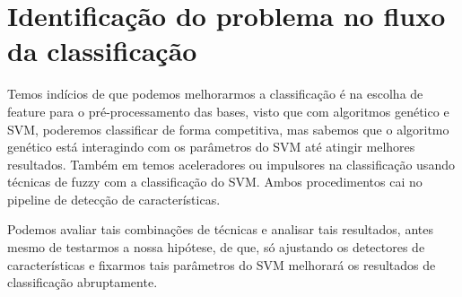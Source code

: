 \documentclass[12pt,a4paper,letterpaper]{article}
\begin{document}
\section{Identificação do problema no fluxo da classificação}
Temos indícios de que podemos melhorarmos a classificação é na escolha de feature
para o pré-processamento das bases, visto que com algoritmos genético e SVM,
poderemos classificar de forma competitiva, mas sabemos que o algoritmo genético
está interagindo com os parâmetros do SVM até atingir melhores resultados.
Também em temos aceleradores ou impulsores na classificação usando técnicas
de fuzzy com a classificação do SVM. Ambos procedimentos cai no pipeline de
detecção de características.

Podemos avaliar tais combinações de técnicas e analisar tais resultados, antes
mesmo de testarmos a nossa hipótese, de que, só ajustando os detectores de
características e fixarmos tais parâmetros do SVM melhorará os resultados de
classificação abruptamente.

\pagebreak
\medskip
\printbibliography[
    heading=bibintoc,
    title={Referências Bibliográficas}
]
\end{document}
